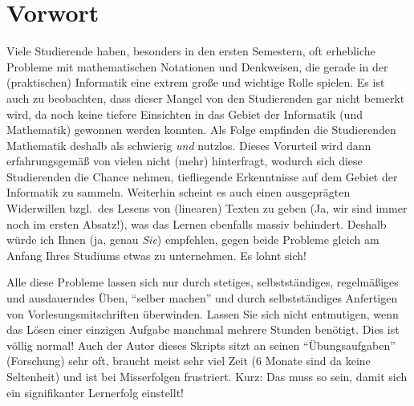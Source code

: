 \section{Vorwort}

Viele Studierende haben, besonders in den ersten Semestern, oft
erhebliche Probleme mit mathematischen Notationen und Denkweisen, die
gerade in der (praktischen) Informatik eine extrem große und wichtige
Rolle spielen. Es ist auch zu beobachten, dass dieser Mangel von den Studierenden gar nicht bemerkt wird, da noch keine tiefere Einsichten in das Gebiet der Informatik  (und Mathematik) gewonnen werden konnten. Als Folge empfinden die Studierenden Mathematik deshalb als schwierig \emph{und} nutzlos. Dieses Vorurteil wird dann erfahrungsgemäß von vielen nicht (mehr) hinterfragt, wodurch sich diese Studierenden die Chance nehmen, tiefliegende Erkenntnisse auf dem Gebiet der Informatik zu sammeln. Weiterhin scheint es auch einen ausgeprägten Widerwillen bzgl.~des Lesens von (linearen) Texten zu geben (Ja, wir sind immer noch im ersten Absatz!), was das Lernen ebenfalls massiv behindert. Deshalb würde ich Ihnen (ja, genau \emph{Sie}) empfehlen, gegen beide Probleme gleich am Anfang Ihres Studiums etwas zu unternehmen. Es lohnt sich!

Alle diese Probleme lassen sich nur durch stetiges,
selbstständiges, regelmäßiges und ausdauerndes Üben, "`selber
machen"' und durch selbstständiges Anfertigen von
Vorlesungsmitschriften überwinden. Lassen Sie sich nicht entmutigen, wenn das Lösen einer einzigen Aufgabe manchmal mehrere Stunden benötigt. Dies ist völlig normal! Auch der Autor dieses Skripts sitzt an seinen "`Übungsaufgaben"' (Forschung) sehr oft, braucht meist sehr viel Zeit (6 Monate sind da keine Seltenheit) und ist bei Misserfolgen frustriert. Kurz: Das muss so sein, damit sich ein signifikanter Lernerfolg einstellt!


